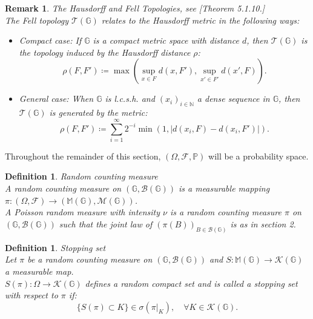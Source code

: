 \documentclass{article} %
\newtheorem{definition}[theorem]{Definition}
\newtheorem{remark}[theorem]{Remark}
\newcommand{\1}{\mathbbm{1}} %
\begin{document}
\begin{remark}\textit{The Hausdorff and Fell Topologies}, see \cite{TCCS}[Theorem 5.1.10.]
    \leavevmode \\
    The Fell topology $\mathcal{T}(\mathbb{G})$ relates to the Hausdorff metric in the following ways:
    \begin{itemize}
        \item Compact case: If $\mathbb{G}$ is a compact metric space with distance $d$, then $\mathcal{T}(\mathbb{G})$ is the topology induced by the Hausdorff distance $\rho$:
        \[
        \rho(F, F') \coloneqq \max \left( \sup_{x \in F} d(x, F'), \sup_{x' \in F'} d(x', F) \right).
        \]
        
        \item General case: When $\mathbb{G}$ is l.c.s.h. and $(x_i)_{i \in \mathbb{N}}$ a dense sequence in $\mathbb{G}$, then $\mathcal{T}(\mathbb{G})$ is generated by the metric:
        \[
        \rho(F, F') \coloneqq \sum_{i=1}^{\infty} 2^{-i} \min\left( 1, |d(x_i, F) - d(x_i, F')| \right).
        \]
    \end{itemize}
\end{remark}

Throughout the remainder of this section, $(\Omega, \mathcal{F}, \mathbb{P})$ will be a probability space.

\begin{definition}\textit{Random counting measure}
    \leavevmode \\
    A random counting measure on $(\mathbb{G}, \mathcal{B}(\mathbb{G}))$ is a measurable mapping $\pi: (\Omega, \mathcal{F}) \to (\mathbb{M}(\mathbb{G}), \mathcal{M}(\mathbb{G}))$.\\
    A Poisson random measure with intensity $\nu$ is a random counting measure $\pi$ on $(\mathbb{G}, \mathcal{B}(\mathbb{G}))$ such that the joint law of $(\pi(B))_{B \in \mathcal{B}(\mathbb{G})}$ is as in section 2.
\end{definition}

\begin{definition} \textit{Stopping set}
    \leavevmode \\
    Let $\pi$ be a random counting measure on $(\mathbb{G}, \mathcal{B}(\mathbb{G}))$ and $S: \mathbb{M}(\mathbb{G}) \to \mathcal{K}(\mathbb{G})$ a measurable map.\\
    $S(\pi): \Omega \to \mathcal{K}(\mathbb{G})$ defines a random compact set  and is called a stopping set with respect to $\pi$ if:
    \[
    \{S(\pi) \subset K\} \in \sigma(\pi|_K), \quad \forall K \in \mathcal{K}(\mathbb{G}).
    \]
\end{definition}
\end{document}
